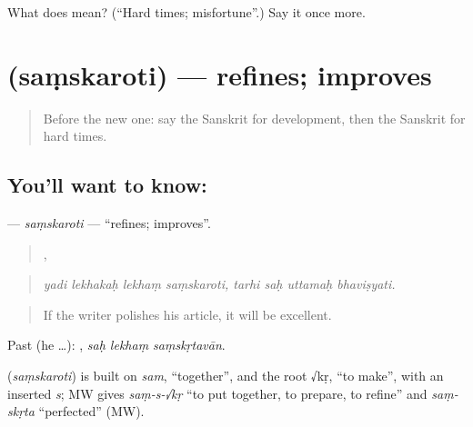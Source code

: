 \begin{tcolorbox}[breakable,colback=teal!4,colframe=teal!35!black,title={Before you move on}]
What does  mean? (\textquotedblleft{}Hard times; misfortune\textquotedblright{}.) Say it once more.
\end{tcolorbox}
\section[\texorpdfstring{\sk{संस्करोति} (saṃskaroti)}{संस्करोति (saṃskaroti)}]{ (saṃskaroti) — refines; improves}

\label{lesson:SA-C387-samskaroti}



\begin{quote}
Before the new one: say the Sanskrit for development, then the Sanskrit for hard times.
\end{quote}

\subsection*{You'll want to know: }
\textbf{} — \emph{saṃskaroti} — \textquotedblleft{}refines; improves\textquotedblright{}.

\begin{quote}
   ,    
\end{quote}

\begin{quote}
\emph{yadi lekhakaḥ lekhaṃ saṃskaroti, tarhi saḥ uttamaḥ bhaviṣyati.}
\end{quote}

\begin{quote}
If the writer polishes his article, it will be excellent.
\end{quote}

Past (he …):   , \emph{saḥ lekhaṃ saṃskṛtavān}.

\begin{cousinweb}
\textbf{} (\emph{saṃskaroti}) is built on \emph{sam}, \textquotedblleft{}together\textquotedblright{}, and the root √kṛ, \textquotedblleft{}to make\textquotedblright{}, with an inserted \emph{s}; MW gives \emph{saṃ-s-√kṛ} \textquotedblleft{}to put together, to prepare, to refine\textquotedblright{} and \emph{saṃ-skṛta} \textquotedblleft{}perfected\textquotedblright{} (MW).
\end{cousinweb}

